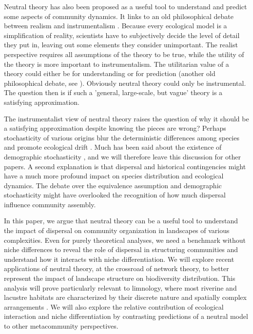 \documentclass[12pt]{article}
\begin{document}
Neutral theory has also been proposed as a useful tool to understand and predict
some aspects of community dynamics. It links to an old philosophical debate
between realism and instrumentalism \parencite{Wennekes2012}. Because every
ecological model is a simplification of reality, scientists have to subjectively
decide the level of detail they put in, leaving out some elements they consider
unimportant. The realist perspective requires all assumptions of the theory
to be true, while the utility of the theory is more important to
instrumentalism. The utilitarian value of a theory could either be for
understanding or for prediction (another old philosophical debate, see
\textcite{Shmueli2010}). Obviously neutral theory could only be instrumental.
The question then is if such a 'general, large-scale, but vague' theory
\parencite{Wennekes2012} is a satisfying approximation.

The instrumentalist view of neutral theory raises the question of why it should
be a satisfying approximation despite knowing the pieces are wrong? Perhaps
stochasticity of various origins blur the deterministic differences among
species and promote ecological drift \parencite{Gravel2011a}. Much has been said
about the existence of demographic stochasticity \parencite{Clark2012}, and we
will therefore leave this discussion for other papers. A second explanation is that
dispersal and historical contingencies might have a much more profound impact on
species distribution \parencite{Bahn2007, Boulangeat2012} and ecological
dynamics. The debate over the equivalence assumption and demographic
stochasticity might have overlooked the recognition of how much dispersal
influence community assembly.

In this paper, we argue that neutral theory can be a useful tool to understand
the impact of dispersal on community organization in landscapes of various
complexities. Even for purely theoretical analyses, we need a benchmark without
niche differences to reveal the role of dispersal in structuring communities and
understand how it interacts with niche differentiation. We will explore recent
applications of neutral theory, at the crossroad of network theory, to better
represent the impact of landscape structure on biodiversity distribution. This
analysis will prove particularly relevant to limnology, where most riverine and
lacustre habitats are characterized by their discrete nature and spatially
complex arrangements \parencite{Peterson2013}. We will also explore the relative
contribution of ecological interaction and niche differentiation by contrasting
predictions of a neutral model to other metacommunity perspectives.
\end{document}
